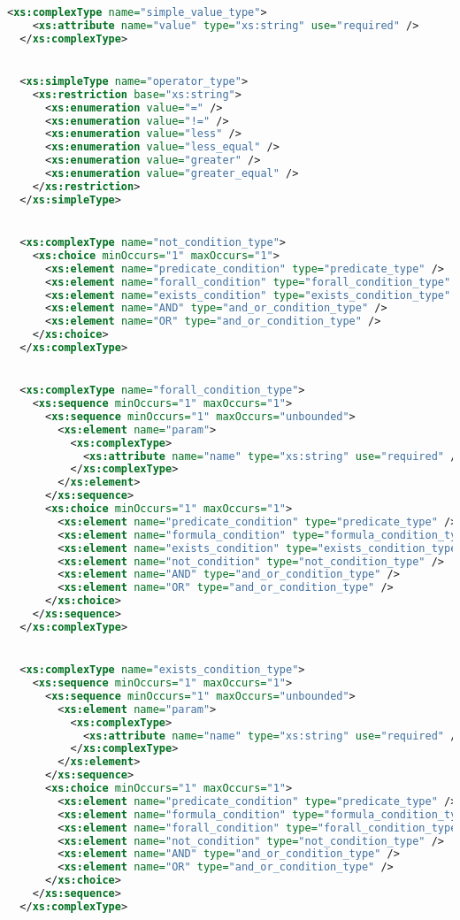 \begin{lstlisting}[style=stylexml,language=XML]
  <xs:complexType name="simple_value_type">
    <xs:attribute name="value" type="xs:string" use="required" />
  </xs:complexType>


  <xs:simpleType name="operator_type">
    <xs:restriction base="xs:string">
      <xs:enumeration value="=" />
      <xs:enumeration value="!=" />
      <xs:enumeration value="less" />
      <xs:enumeration value="less_equal" />
      <xs:enumeration value="greater" />
      <xs:enumeration value="greater_equal" />
    </xs:restriction>
  </xs:simpleType>


  <xs:complexType name="not_condition_type">
    <xs:choice minOccurs="1" maxOccurs="1">
      <xs:element name="predicate_condition" type="predicate_type" />
      <xs:element name="forall_condition" type="forall_condition_type" />
      <xs:element name="exists_condition" type="exists_condition_type" />
      <xs:element name="AND" type="and_or_condition_type" />
      <xs:element name="OR" type="and_or_condition_type" />
    </xs:choice>
  </xs:complexType>


  <xs:complexType name="forall_condition_type">
    <xs:sequence minOccurs="1" maxOccurs="1">
      <xs:sequence minOccurs="1" maxOccurs="unbounded">
        <xs:element name="param">
          <xs:complexType>
            <xs:attribute name="name" type="xs:string" use="required" />
          </xs:complexType>
        </xs:element>
      </xs:sequence>
      <xs:choice minOccurs="1" maxOccurs="1">
        <xs:element name="predicate_condition" type="predicate_type" />
        <xs:element name="formula_condition" type="formula_condition_type" />
        <xs:element name="exists_condition" type="exists_condition_type" />
        <xs:element name="not_condition" type="not_condition_type" />
        <xs:element name="AND" type="and_or_condition_type" />
        <xs:element name="OR" type="and_or_condition_type" />
      </xs:choice>
    </xs:sequence>
  </xs:complexType>


  <xs:complexType name="exists_condition_type">
    <xs:sequence minOccurs="1" maxOccurs="1">
      <xs:sequence minOccurs="1" maxOccurs="unbounded">
        <xs:element name="param">
          <xs:complexType>
            <xs:attribute name="name" type="xs:string" use="required" />
          </xs:complexType>
        </xs:element>
      </xs:sequence>
      <xs:choice minOccurs="1" maxOccurs="1">
        <xs:element name="predicate_condition" type="predicate_type" />
        <xs:element name="formula_condition" type="formula_condition_type" />
        <xs:element name="forall_condition" type="forall_condition_type" />
        <xs:element name="not_condition" type="not_condition_type" />
        <xs:element name="AND" type="and_or_condition_type" />
        <xs:element name="OR" type="and_or_condition_type" />
      </xs:choice>
    </xs:sequence>
  </xs:complexType>



\end{lstlisting}
